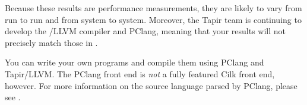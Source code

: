 Because these results are performance measurements, they are likely to
vary from run to run and from system to system.  Moreover, the Tapir team is
continuing to develop the \tapir/\mbox{LLVM} compiler and PClang,
meaning that your results will not precisely match those in
.

You can write your own programs and compile them using PClang and
Tapir/LLVM\@.  The PClang front end is \emph{not} a fully featured
Cilk front end, however.  For more information on the source language
parsed by PClang, please see
.

